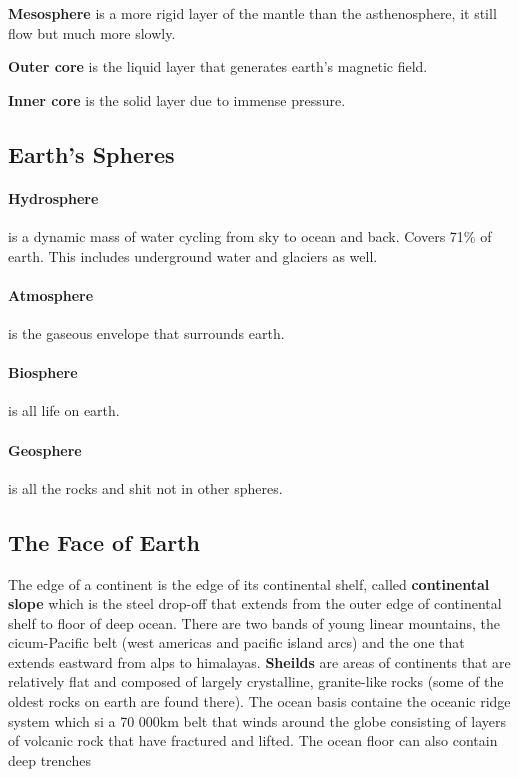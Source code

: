 \documentclass{article}
\begin{document}
\textbf{Mesosphere} is a more rigid layer of the mantle than the asthenosphere, it still flow but much more slowly.

\textbf{Outer core} is the liquid layer that generates earth's magnetic field.

\textbf{Inner core} is the solid layer due to immense pressure.

\subsection{Earth's Spheres} %
\label{sub:earth_s_spheres}

\paragraph{Hydrosphere} is a dynamic mass of water cycling from sky to ocean and back. Covers 71\% of earth. This includes underground water and glaciers as well.

\paragraph{Atmosphere} is the gaseous envelope that surrounds earth.

\paragraph{Biosphere} is all life on earth.

\paragraph{Geosphere} is all the rocks and shit not in other spheres.


\subsection{The Face of Earth} %
\label{sub:the_face_of_earth}
The edge of a continent is the edge of its continental shelf, called \textbf{continental slope} which is the steel drop-off that extends from the outer edge of continental shelf to floor of deep ocean. There are two bands of young linear mountains, the cicum-Pacific belt (west americas and pacific island arcs) and the one that extends eastward from alps to himalayas. \textbf{Sheilds} are areas of continents that are relatively flat and composed of largely crystalline, granite-like rocks (some of the oldest rocks on earth are found there). The ocean basis containe the oceanic ridge system which si a 70 000km belt that winds around the globe consisting of layers of volcanic rock that have fractured and lifted. The ocean floor can also contain deep trenches
\end{document}
